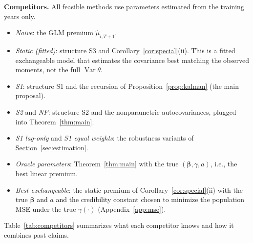 \documentclass[mathematics,article,submit,moreauthors]{Definitions/mdpi}
\DeclareMathOperator{\Var}{Var}
\newcommand{\bbeta}{\boldsymbol{\beta}}
\begin{document}
\textbf{Competitors.} All feasible methods use parameters estimated from the training years only.
\begin{itemize}
\item \emph{Naive}: the GLM premium $\hat\mu_{i,T+1}$.
\item \emph{Static (fitted)}: structure S3 and Corollary~\ref{cor:special}(ii). This is a fitted exchangeable model that estimates the covariance best matching the observed moments, not the full $\Var\theta$.
\item \emph{S1}: structure S1 and the recursion of Proposition~\ref{prop:kalman} (the main proposal).
\item \emph{S2} and \emph{NP}: structure S2 and the nonparametric autocovariances, plugged into Theorem~\ref{thm:main}.
\item \emph{S1 lag-only} and \emph{S1 equal weights}: the robustness variants of Section~\ref{sec:estimation}.
\item \emph{Oracle parameters}: Theorem~\ref{thm:main} with the true $(\bbeta,\gamma,a)$, i.e., the best linear premium.
\item \emph{Best exchangeable}: the static premium of Corollary~\ref{cor:special}(ii) with the true $\bbeta$ and $a$ and the credibility constant chosen to minimize the population MSE under the true $\gamma(\cdot)$ (Appendix~\ref{app:mse}).
\end{itemize}
Table~\ref{tab:competitors} summarizes what each competitor knows and how it combines past claims.
\end{document}
